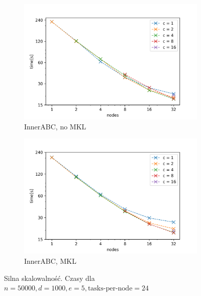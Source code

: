 \documentclass{article}
\begin{document}
\begin{figure}[ht!]
\begin{subfigure}[b]{0.45\textwidth}
        \includegraphics[width=\textwidth]{charts/s_50000_1000_5_i}
        \caption{InnerABC, no MKL}
    \end{subfigure}
    \begin{subfigure}[b]{0.45\textwidth}
        \includegraphics[width=\textwidth]{charts/s_50000_1000_5_i_m}
        \caption{InnerABC, MKL}
    \end{subfigure}
    \caption{Silna skalowalność. Czasy dla $n=50000, d=1000, e=5, \text{tasks-per-node}=24$}
    \label{fig:scal_strong_1}
\end{figure}
\end{document}
